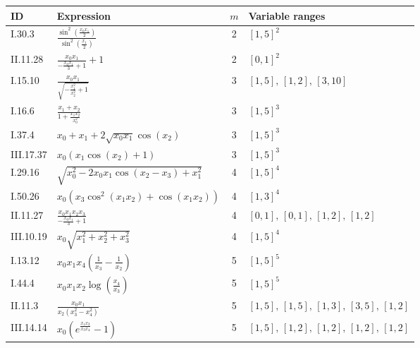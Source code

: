 \setlength{\tabcolsep}{4pt}
\begin{tabular}{@{}llcl@{}}
\toprule
ID & Expression & $m$ & Variable ranges \\
\midrule
I.30.3 & $\frac{\sin^{2}{\left(\frac{x_{0} x_{1}}{2} \right)}}{\sin^{2}{\left(\frac{x_{1}}{2} \right)}}$ & 2 & $[1, 5]^{2}$ \\
II.11.28 & $\frac{x_{0} x_{1}}{- \frac{x_{0} x_{1}}{3} + 1} + 1$ & 2 & $[0, 1]^{2}$ \\
I.15.10 & $\frac{x_{0} x_{1}}{\sqrt{- \frac{x_{1}^{2}}{x_{2}^{2}} + 1}}$ & 3 & $[1, 5],\, [1, 2],\, [3, 10]$ \\
I.16.6 & $\frac{x_{1} + x_{2}}{1 + \frac{x_{1} x_{2}}{x_{0}^{2}}}$ & 3 & $[1, 5]^{3}$ \\
I.37.4 & $x_{0} + x_{1} + 2 \sqrt{x_{0} x_{1}} \cos{\left(x_{2} \right)}$ & 3 & $[1, 5]^{3}$ \\
III.17.37 & $x_{0} \left(x_{1} \cos{\left(x_{2} \right)} + 1\right)$ & 3 & $[1, 5]^{3}$ \\
I.29.16 & $\sqrt{x_{0}^{2} - 2 x_{0} x_{1} \cos{\left(x_{2} - x_{3} \right)} + x_{1}^{2}}$ & 4 & $[1, 5]^{4}$ \\
I.50.26 & $x_{0} \left(x_{3} \cos^{2}{\left(x_{1} x_{2} \right)} + \cos{\left(x_{1} x_{2} \right)}\right)$ & 4 & $[1, 3]^{4}$ \\
II.11.27 & $\frac{x_{0} x_{1} x_{2} x_{3}}{- \frac{x_{0} x_{1}}{3} + 1}$ & 4 & $[0, 1],\, [0, 1],\, [1, 2],\, [1, 2]$ \\
III.10.19 & $x_{0} \sqrt{x_{1}^{2} + x_{2}^{2} + x_{3}^{2}}$ & 4 & $[1, 5]^{4}$ \\
I.13.12 & $x_{0} x_{1} x_{4} \left(\frac{1}{x_{3}} - \frac{1}{x_{2}}\right)$ & 5 & $[1, 5]^{5}$ \\
I.44.4 & $x_{0} x_{1} x_{2} \log{\left(\frac{x_{4}}{x_{3}} \right)}$ & 5 & $[1, 5]^{5}$ \\
II.11.3 & $\frac{x_{0} x_{1}}{x_{2} \left(x_{3}^{2} - x_{4}^{2}\right)}$ & 5 & $[1, 5],\, [1, 5],\, [1, 3],\, [3, 5],\, [1, 2]$ \\
III.14.14 & $x_{0} \left(e^{\frac{x_{1} x_{2}}{x_{3} x_{4}}} - 1\right)$ & 5 & $[1, 5],\, [1, 2],\, [1, 2],\, [1, 2],\, [1, 2]$ \\
\bottomrule
\end{tabular}
